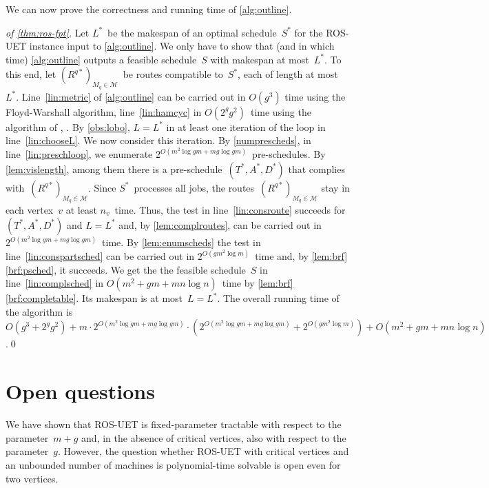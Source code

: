 \documentclass[natbib,sort,smallextended,envcountsame,envcountsect,numbook]{svjour3}
\newcommand{\bigO}{O}
\newcommand{\ROSUPT}{\textsc{ROS-UET}}
\newcommand{\Ms}{\mathcal M}
\newcommand{\nmach}{m}
\newcommand{\nverts}{g}
\begin{document}
\noindent
We can now prove the correctness and running time of \cref{alg:outline}.

\begin{proof}[of \cref{thm:ros-fpt}]
  Let \(L^*\)~be the makespan of an optimal schedule~\(S^*\)
  for the \ROSUPT{} instance input to \cref{alg:outline}.
  We only have to show that (and in which time) \cref{alg:outline} outputs
  a feasible schedule~\(S\) with makespan at most~\(L^*\).
  To this end, let \((R^{q*})_{M_q\in\Ms}\)~be routes compatible to~\(S^*\),
  each of length at most~\(L^*\).
  Line~\ref{lin:metric} of \cref{alg:outline}
  can be carried out in \(O(g^3)\) time
  using the Floyd-Warshall algorithm,
  line~\ref{lin:hamcyc} in \(O(2^gg^2)\)~time using
  the algorithm of \citet{Bell62}, \citet{HelK62}.  By
  \cref{obs:lobo}, \(L=L^*\) in at least one iteration of the loop in
  line~\ref{lin:chooseL}.
  We now consider this iteration.
  By \cref{numprescheds},  in line~\ref{lin:preschloop}, we enumerate
  \(2^{O(m^2\log gm+mg\log gm)}\)~pre-schedules.
  By \cref{lem:vislength}, among them there is a pre-schedule~\((T^*,A^*,D^*)\)
  that complies with~\((R^{q*})_{M_q\in\Ms}\).
  Since \(S^*\)~processes all jobs, the routes~\((R^{q*})_{M_q\in\Ms}\)
  stay in each vertex~\(v\) at least \(n_v\)~time.
  Thus, the test in line~\ref{lin:consroute} succeeds for~\((T^*,A^*,D^*)\) and \(L=L^*\)
  and, by \cref{lem:complroutes}, 
  can be carried out in \(2^{O(m^2\log gm+mg\log gm)}\)~time.
  By \cref{lem:enumscheds} the test in line~\ref{lin:conspartsched}
  can be carried out in \(2^{\bigO(\nverts\nmach^2\log\nmach)}\)~time
  and, by \cref{lem:brf}\eqref{brf:psched}, it succeeds. We get the
  the feasible schedule~\(S\) in line~\ref{lin:complsched}
  in \(O(m^2+gm+mn\log n)\)~time by \cref{lem:brf}\eqref{brf:completable}.
  Its makespan is at most~\(L=L^*\).
  The overall running time of the algorithm is \(O(g^3+2^gg^2)+m\cdot 2^{O(m^2\log gm+mg\log gm)}\cdot (2^{O(m^2\log gm+mg\log gm)}+ 2^{\bigO(\nverts\nmach^2\log\nmach)})+O(m^2+gm+mn\log n)\).\qed
\end{proof}

\section{Open questions}\label{sec:conclusion}
\noindent
We have shown that \ROSUPT{} is fixed-parameter tractable
with respect to the parameter~\(m+g\) and,
in the absence of critical vertices,
also with respect to the parameter~\(g\).
However, the question
whether \ROSUPT{} with critical vertices
and an unbounded number of machines
is polynomial-time solvable is open even for two vertices.
\end{document}
